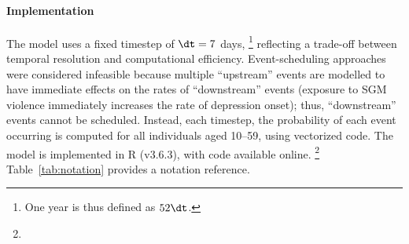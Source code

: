 \paragraph{Implementation}
The model uses a fixed timestep of $\dt = 7$ days,%
\footnote{One year is thus defined as $52\dt$.}
reflecting a trade-off between temporal resolution and computational efficiency.
Event-scheduling approaches were considered infeasible because
multiple ``upstream'' events are modelled to have
immediate effects on the rates of ``downstream'' events
(\eg exposure to SGM violence
immediately increases the rate of depression onset);
thus, ``downstream'' events cannot be scheduled.
Instead, each timestep, the probability of each event occurring
is computed for all individuals aged 10--59, using vectorized code.
The model is implemented in R (v3.6.3), with code available online.%
\footnote{}
Table~\ref{tab:notation} provides a notation reference.
